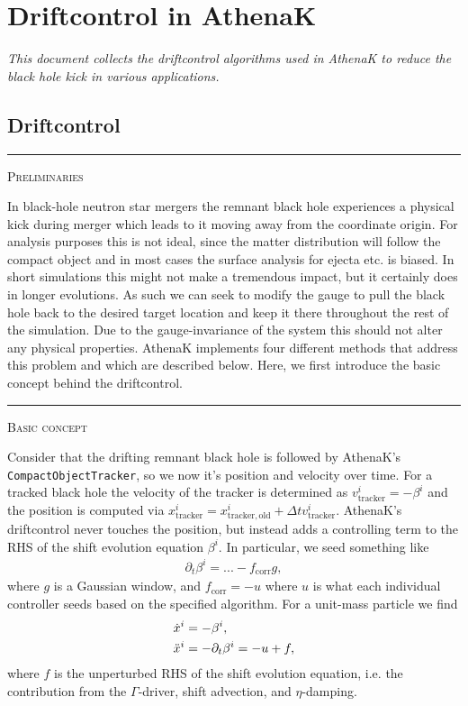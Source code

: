 \documentclass{article}
\newcommand{\var}[1]{%
  {\setlength{\fboxsep}{1.5pt}%
   \colorbox{varbg}{\textcolor{varfg}{\texttt{\small #1}}}}}
\newcommand{\step}[1]{%
  \par\medskip\noindent
  {\color{stepfg}\rule[-0.15ex]{2pt}{1.5ex}\hspace{0.5em}\scshape #1}%
  \hspace{0.75em}\ignorespaces}
\begin{document}
\section*{Driftcontrol in AthenaK}
\textit{This document collects the driftcontrol algorithms used in AthenaK to reduce
the black hole kick in various applications.}

\subsection*{Driftcontrol}
\step{Preliminaries}
In black-hole neutron star mergers the remnant black hole experiences a physical kick during merger which leads
to it moving away from the coordinate origin. For analysis purposes this is not ideal, since the matter distribution will follow the
compact object and in most cases the surface analysis for ejecta etc. is biased. In short simulations this might not make
a tremendous impact, but it certainly does in longer evolutions. As such we can seek to modify the gauge to pull the black hole
back to the desired target location and keep it there throughout the rest of the simulation. Due to the gauge-invariance of the system
this should not alter any physical properties. AthenaK implements four different methods that address this problem and which are
described below. Here, we first introduce the basic concept behind the driftcontrol.
\step{Basic concept} Consider that the drifting remnant black hole is followed by AthenaK's \var{CompactObjectTracker}, so we now it's
position and velocity over time. For a tracked black hole the velocity of the tracker is determined as $v_{\mathrm{tracker}}^i=-\beta^i$ and
the position is computed via $x_{\mathrm{tracker}}^i=x_{\mathrm{tracker,old}}^i+\Delta tv_{\mathrm{tracker}}^i$. AthenaK's driftcontrol never touches
the position, but instead adds a controlling term to the RHS of the shift evolution equation $\beta^i$. In particular, we seed something like
\begin{align}
  \partial_t\beta^i = ...-f_{\mathrm{corr}}g,
\end{align}
where $g$ is a Gaussian window, and $f_{\mathrm{corr}}=-u$ where $u$ is what each individual controller seeds based on the specified algorithm. For
a unit-mass particle we find
\begin{align}
  \Dot{x}^i&=-\beta^i,\\
  \Ddot{x}^i&=-\partial_t\beta^i=-u+f,
\end{align}
where $f$ is the unperturbed RHS of the shift evolution equation, i.e. the contribution from the $\Gamma$-driver, shift advection, and $\eta$-damping.
\end{document}
